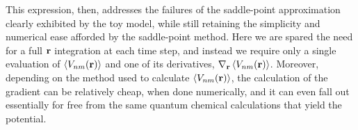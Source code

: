 This expression, then, addresses the failures of the saddle-point approximation clearly exhibited by the toy model, while still retaining the simplicity and numerical ease afforded by the saddle-point method. Here we are spared the need for a full $\vb{r}$ integration at each time step, and instead we require only a single evaluation of $\left\langle V_{nm}\mathopen{}\left( \vb{r} \right)\mathclose{} \right\rangle$ and one of its derivatives, $\nabla_{\vb{r}}\left\langle V_{nm}\mathopen{}\left( \vb{r} \right)\mathclose{} \right\rangle$. Moreover, depending on the method used to calculate $\left\langle V_{nm}\mathopen{}\left( \vb{r} \right)\mathclose{} \right\rangle$, the calculation of the gradient can be relatively cheap, when done numerically, and it can even fall out essentially for free from the same quantum chemical calculations that yield the potential.

















